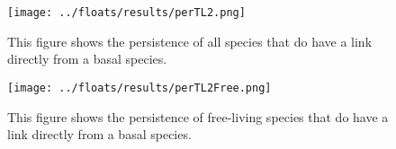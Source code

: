 \documentclass[11pt]{amsart}
\begin{document}
\begin{figure}[h]
\captionsetup[subfigure]{labelfont = it, textfont = it,labelformat = parens,labelsep = space}
    \begin{minipage}{.45\textwidth}
    \end{minipage}
    \begin{minipage}{.45\textwidth}
    \end{minipage}
    \texttt{[image: ../floats/results/perTL2.png]}
    \begin{minipage}{.45\textwidth}
    \end{minipage}
    \begin{minipage}{.45\textwidth}
    \end{minipage}
\caption{This figure shows the persistence of all species that do have a link directly from a basal species.\label{tl2-all}}
\end{figure}

\begin{figure}[h]
\captionsetup[subfigure]{labelfont = it, textfont = it,labelformat = parens,labelsep = space}
    \begin{minipage}{.45\textwidth}
    \end{minipage}
    \begin{minipage}{.45\textwidth}
    \end{minipage}
    \texttt{[image: ../floats/results/perTL2Free.png]}
    \begin{minipage}{.45\textwidth}
    \end{minipage}
    \begin{minipage}{.45\textwidth}
    \end{minipage}
\caption{This figure shows the persistence of free-living species that do have a link directly from a basal species.\label{tl2-free}}
\end{figure}
\end{document}
